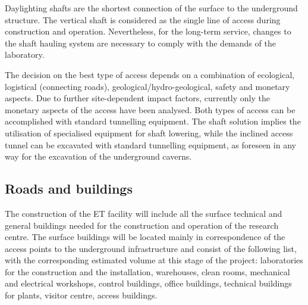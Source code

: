 Daylighting shafts are the shortest connection of the surface to the underground structure. The vertical shaft is considered as the single line of access during construction and operation. Nevertheless, for the long-term service, changes to the shaft hauling system are necessary to comply with the demands of the laboratory.

The decision on the best type of access depends on a combination of ecological, logistical (connecting roads), geological/hydro-geological, safety and monetary aspects. 
Due to further site-dependent impact factors, currently only the monetary
aspects of the access have been analysed. 
Both types of access can be accomplished with standard tunnelling equipment.
The shaft solution implies the utilisation of specialised equipment for shaft lowering, while the inclined access tunnel can be excavated with standard tunnelling equipment, as foreseen in any way for the excavation of the underground caverns.

\subsection{Roads and buildings}
\label{Sec:RoadsBuildings}

The construction of the ET facility will include all the surface technical and general buildings needed for the construction and operation of the research centre.
The surface buildings will be located mainly in correspondence of the access points to the underground infrastructure and consist of the following list, with the corresponding estimated volume at this stage of the project: laboratories for the construction and the installation, warehouses, clean rooms, mechanical and electrical workshops, control buildings, office buildings, technical buildings for plants, visitor centre, access buildings.

